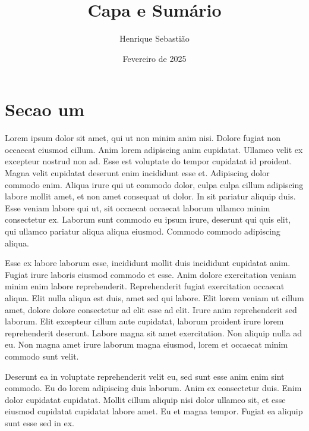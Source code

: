 \documentclass{article}
\begin{document}
\title{\textbf{\Huge Capa e Sumário}}
\author{Henrique Sebastião}
\date{Fevereiro de 2025}
\maketitle

\newpage

\tableofcontents

\newpage

\section{Secao um}

Lorem ipsum dolor sit amet, qui ut non minim anim nisi. Dolore fugiat
non occaecat eiusmod cillum.
Anim lorem adipiscing anim cupidatat. Ullamco velit ex excepteur
nostrud non ad. Esse est voluptate do tempor cupidatat id proident.
Magna velit cupidatat deserunt enim incididunt esse et. Adipiscing
dolor commodo enim.
Aliqua irure qui ut commodo dolor, culpa culpa cillum adipiscing
labore mollit amet, et non amet consequat ut dolor.
In sit pariatur aliquip duis. Esse veniam labore qui ut, sit occaecat
occaecat laborum ullamco minim consectetur ex.
Laborum sunt commodo eu ipsum irure, deserunt qui quis elit, qui
ullamco pariatur aliqua aliqua eiusmod. Commodo commodo adipiscing aliqua.

Esse ex labore laborum esse, incididunt mollit duis incididunt
cupidatat anim. Fugiat irure laboris eiusmod commodo et esse. Anim
dolore exercitation veniam minim enim labore reprehenderit.
Reprehenderit fugiat exercitation occaecat aliqua. Elit nulla aliqua
est duis, amet sed qui labore.
Elit lorem veniam ut cillum amet, dolore dolore consectetur ad elit
esse ad elit. Irure anim reprehenderit sed laborum.
Elit excepteur cillum aute cupidatat, laborum proident irure lorem
reprehenderit deserunt. Labore magna sit amet exercitation.
Non aliquip nulla ad eu. Non magna amet irure laborum magna eiusmod,
lorem et occaecat minim commodo sunt velit.

Deserunt ea in voluptate reprehenderit velit eu, sed sunt esse anim
enim sint commodo.
Eu do lorem adipiscing duis laborum. Anim ex consectetur duis. Enim
dolor cupidatat cupidatat.
Mollit cillum aliquip nisi dolor ullamco sit, et esse eiusmod
cupidatat cupidatat labore amet. Eu et magna tempor.
Fugiat ea aliquip sunt esse sed in ex.
\end{document}

